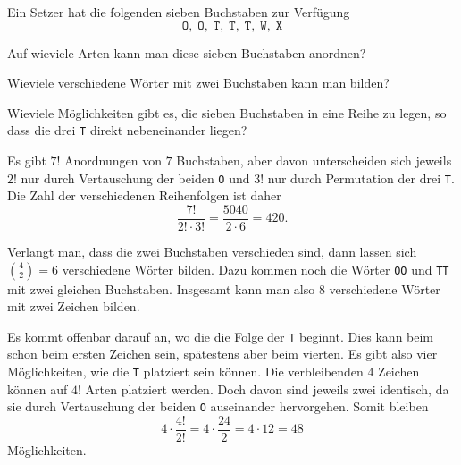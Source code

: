 Ein Setzer hat die folgenden sieben Buchstaben zur Verfügung
\[
\texttt{O},\;
\texttt{O},\;
\texttt{T},\;
\texttt{T},\;
\texttt{T},\;
\texttt{W},\;
\texttt{X}
\]
\begin{teilaufgaben}
\item Auf wieviele Arten kann man diese sieben Buchstaben anordnen?
\item Wieviele verschiedene Wörter mit zwei Buchstaben kann man bilden?
\item Wieviele Möglichkeiten gibt es, die sieben Buchstaben in eine Reihe
zu legen, so dass die drei \texttt{T} direkt nebeneinander liegen?
\end{teilaufgaben}

\begin{loesung}
\begin{teilaufgaben}
\item
Es gibt $7!$ Anordnungen von $7$ Buchstaben, aber davon unterscheiden sich
jeweils $2!$ nur durch Vertauschung der beiden \texttt{O} und $3!$ nur
durch Permutation der drei \texttt{T}.
Die Zahl der verschiedenen Reihenfolgen ist daher
\[
\frac{7!}{2!\cdot 3!}=\frac{5040}{2\cdot 6} = 420.
\]
\item
Verlangt man, dass die zwei Buchstaben verschieden sind, dann lassen sich
$\binom{4}{2}=6$ verschiedene Wörter bilden.
Dazu kommen noch die Wörter \texttt{OO} und \texttt{TT} mit zwei gleichen
Buchstaben.
Insgesamt kann man also 8 verschiedene Wörter mit zwei Zeichen bilden.
\item
Es kommt offenbar darauf an, wo die die Folge der \texttt{T} beginnt.
Dies kann beim schon beim ersten Zeichen sein, spätestens aber beim vierten.
Es gibt also vier Möglichkeiten, wie die \texttt{T} platziert sein können.
Die verbleibenden 4 Zeichen können auf $4!$ Arten platziert werden.
Doch davon sind jeweils zwei identisch, da sie durch Vertauschung der
beiden \texttt{O} auseinander hervorgehen.
Somit bleiben 
\[
4\cdot\frac{4!}{2!}=4\cdot \frac{24}{2}=4\cdot 12=48
\]
Möglichkeiten.
\end{teilaufgaben}
\end{loesung}



